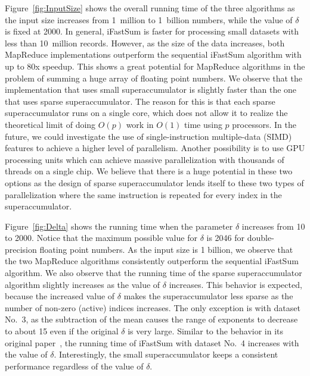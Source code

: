 \documentclass[11pt]{article}
\begin{document}
Figure~\ref{fig:InputSize} shows the overall running time of the
three algorithms as the input size increases from 1~million to
1~billion numbers, while the value of $\delta$ is fixed at 2000.
In general, iFastSum is faster for processing small datasets with
less than 10~million records. However, as the size of the data
increases, both MapReduce implementations outperform the sequential
iFastSum algorithm with up to 80x speedup. This shows a great
potential for MapReduce algorithms in the problem of summing a huge
array of floating point numbers. We observe that the implementation
that uses small superaccumulator is slightly faster than the one
that uses sparse superaccumulator. The reason for this is that each
sparse superaccumulator runs on a single core, which does not allow
it to realize the theoretical limit of doing $O(p)$ work in $O(1)$
time using $p$ processors. In the future, we could investigate the
use of single-instruction multiple-data (SIMD) features to achieve
a higher level of parallelism. Another possibility is to use GPU
processing units which can achieve massive parallelization with
thousands of threads on a single chip. We believe that there is a
huge potential in these two options as the design of sparse
superaccumulator lends itself to these two types of parallelization
where the same instruction is repeated for every index in the
superaccumulator.

Figure~\ref{fig:Delta} shows the running time when the parameter
$\delta$ increases from 10 to 2000. Notice that the maximum possible
value for $\delta$ is 2046 for double-precision floating point
numbers. As the input size is 1 billion, we observe that the two
MapReduce algorithms consistently outperform the sequential iFastSum
algorithm. We also observe that the running time of the sparse
superaccumulator algorithm slightly increases as the value of
$\delta$ increases. This behavior is expected, because the increased
value of $\delta$ makes the superaccumulator less sparse as the
number of non-zero (active) indices increases. The only exception
is with dataset No.~3, as the subtraction of the mean causes the
range of exponents to decrease to about 15 even if the original
$\delta$ is very large.  Similar to the behavior in its original
paper~\cite{doi:10.1137/070710020}, the running time of iFastSum
with dataset No.~4 increases with the value of $\delta$. Interestingly,
the small superaccumulator keeps a consistent performance regardless
of the value of $\delta$.
\end{document}
